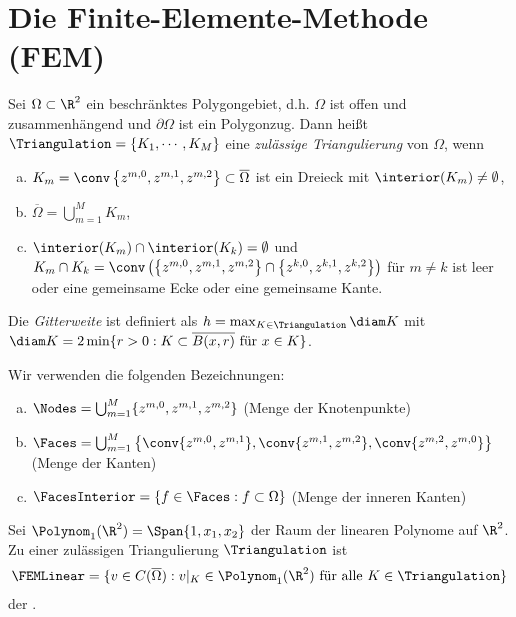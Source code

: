 \section{Die Finite-Elemente-Methode (FEM)}

\begin{Definition}
    \label{def:3.1}
    Sei $\Omega \subset \R^2$ ein beschränktes Polygongebiet, d.h. $\Omega$ ist offen und
    zusammenhängend und $\partial\Omega$ ist ein Polygonzug. Dann heißt
    $\Triangulation = \{K_1, \cdots, K_M\}$ eine
    \emph{zulässige Triangulierung} von $\Omega$, wenn
    \begin{enumerate}[a)]
      \item
	    $K_m = \conv\left\{z^{m,0}, z^{m,1}, z^{m,2}\right\} \subset
        \overline\Omega$ ist ein Dreieck mit $\interior(K_m) \neq \emptyset$,
      \item
	    $\overline\Omega = \bigcup_{m=1}^M K_m$,
      \item
	    $\interior(K_m) \cap \interior(K_k) = \emptyset$ und
        $K_m \cap K_k = \conv\left(\left\{z^{m,0}, z^{m,1}, z^{m,2}\right\} \cap
        \left\{z^{k,0}, z^{k,1}, z^{k,2}\right\}\right)$ für $m \neq k$ ist
        leer oder eine gemeinsame Ecke oder eine gemeinsame Kante.
    \end{enumerate}
\end{Definition}


Die \emph{Gitterweite} ist definiert als $h = \max_{K\in\Triangulation} \diam K$
mit $\diam K = 2 \min\{r > 0: K \subset \overline{B(x, r)} \text{ für } x \in K\}$.

Wir verwenden die folgenden Bezeichnungen:
\begin{enumerate}[a)]
    \item $\Nodes = \bigcup_{m=1}^M \{z^{m,0},z^{m,1},z^{m,2}\}$ (Menge der Knotenpunkte)
    \item $\Faces = \bigcup_{m=1}^M \big\{ \conv\{z^{m,0},z^{m,1}\}, \conv\{z^{m,1},z^{m,2}\}, \conv\{z^{m,2},z^{m,0}\} \big\}$ (Menge der Kanten)
    \item $\FacesInterior = \{f \in \Faces: f \subset \Omega \}$ (Menge der inneren Kanten)
\end{enumerate}



\begin{Definition}
    \label{def;3.2}
    Sei $\Polynom_1(\R^2) = \Span\{1, x_1, x_2\}$ der Raum der linearen Polynome auf $\R^2$.
    Zu einer zulässigen Triangulierung $\Triangulation$ ist
    \begin{eqnarray*}
        \FEMLinear = \{v \in C(\overline\Omega): v|_K \in
        \Polynom_1(\R^2) \text{ für alle } K \in \Triangulation\}
    \end{eqnarray*}
    der .
\end{Definition}


